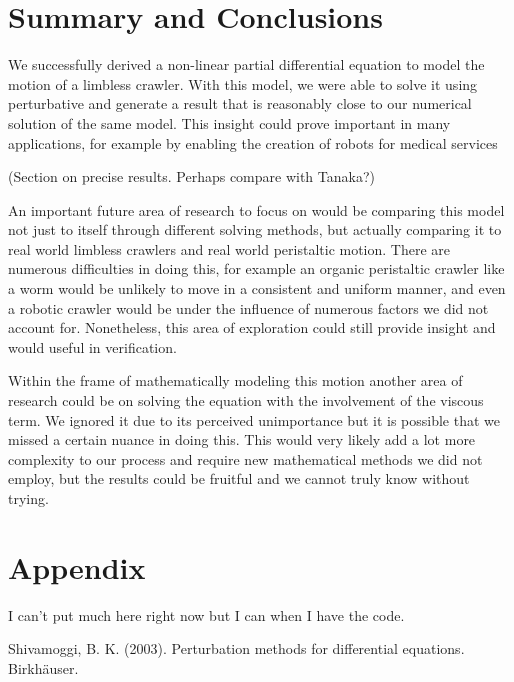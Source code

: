 \documentclass{article}
\begin{document}
\section{Summary and Conclusions}
\par We successfully derived a non-linear partial differential equation to model the motion of a limbless crawler. With this model, we were able to solve it using perturbative and generate a result that is reasonably close to our numerical solution of the same model. This insight could prove important in many applications, for example by enabling the creation of robots for medical services 
\par (Section on precise results. Perhaps compare with Tanaka?)
\par An important future area of research to focus on would be comparing this model not just to itself through different solving methods, but actually comparing it to real world limbless crawlers and real world peristaltic motion. There are numerous difficulties in doing this, for example an organic peristaltic crawler like a worm would be unlikely to move in a consistent and uniform manner, and even a robotic crawler would be under the influence of numerous factors we did not account for. Nonetheless, this area of exploration could still provide insight and would useful in verification.
\par Within the frame of mathematically modeling this motion another area of research could be on solving the equation with the involvement of the viscous term. We ignored it due to its perceived unimportance but it is possible that we missed a certain nuance in doing this. This would very likely add a lot more complexity to our process and require new mathematical methods we did not employ, but the results could be fruitful and we cannot truly know without trying.  

\section{Appendix}
\par I can't put much here right now but I can when I have the code.


\begin{thebibliography}{9}
Shivamoggi, B. K. (2003). Perturbation methods for differential equations. Birkhäuser.

\end{thebibliography}
\end{document}
